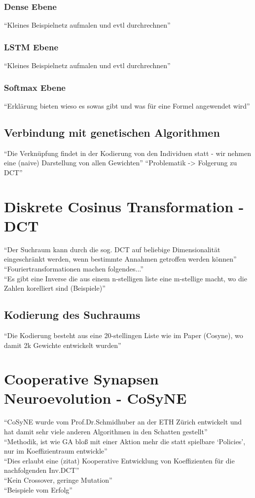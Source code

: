             \subsubsection*{Dense Ebene}
                ``Kleines Beispielnetz aufmalen und evtl durchrechnen''
            \subsubsection*{LSTM Ebene}
                ``Kleines Beispielnetz aufmalen und evtl durchrechnen''
            \subsubsection*{Softmax Ebene}
                ``Erklärung bieten wieso es sowas gibt und was für eine Formel angewendet wird''
        \subsection{Verbindung mit genetischen Algorithmen}
            ``Die Verknüpfung findet in der Kodierung von den Individuen statt - wir nehmen eine (naive) Darstellung von allen Gewichten''
            ``Problematik -> Folgerung zu DCT''

    \section{Diskrete Cosinus Transformation - DCT}
        ``Der Suchraum kann durch die sog. DCT auf beliebige Dimensionalität eingeschränkt werden, wenn bestimmte Annahmen getroffen werden können'' \\
        ``Fouriertransformationen machen folgendes...'' \\
        ``Es gibt eine Inverse die aus einem n-stelligen liste eine m-stellige macht, wo die Zahlen korelliert sind (Beispiele)''
        \subsection{Kodierung des Suchraums}
            ``Die Kodierung besteht aus eine 20-stellingen Liste wie im Paper (Cosyne), wo damit 2k Gewichte entwickelt wurden''

    \section{Cooperative Synapsen Neuroevolution - CoSyNE}
        ``CoSyNE wurde vom Prof.Dr.Schmidhuber an der ETH Zürich entwickelt und hat damit sehr viele anderen Algorithmen in den Schatten gestellt''\\
        ``Methodik, ist wie GA bloß mit einer Aktion mehr die statt spielbare `Policies', nur im Koeffizientraum entwickle'' \\
        ``Dies erlaubt eine (zitat) Kooperative Entwicklung von Koeffizienten für die nachfolgenden Inv.DCT'' \\
        ``Kein Crossover, geringe Mutation'' \\
        ``Beispiele vom Erfolg'' \\
